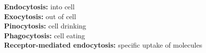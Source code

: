 \textbf{Endocytosis:} into cell\\
\textbf{Exocytosis:} out of cell\\
\textbf{Pinocytosis:} cell drinking\\
\textbf{Phagocytosis:} cell eating\\
\textbf{Receptor-mediated endocytosis:} specific uptake of molecules\\
